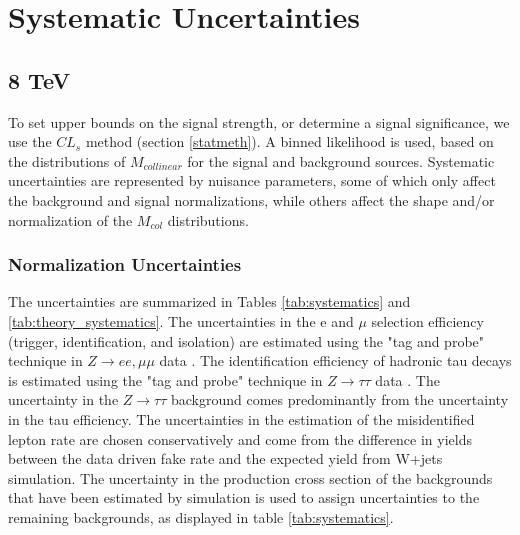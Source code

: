 \documentclass[oneside, letterpaper, oldfontcommands]{memoir}
\begin{document}
\section{Systematic Uncertainties}\label{sysuncert}
\subsection{8 TeV}

\qquad To set upper bounds on the signal strength, or determine a signal significance, we use the $CL_{s}$ method (section \ref{statmeth}).  A binned likelihood is used, based on the distributions of $M_{collinear}$ for the signal and background sources. Systematic uncertainties are represented by nuisance parameters, some of which only affect the background and signal normalizations, while others affect the shape and/or normalization of the $M_{col}$ distributions. 

\subsubsection{Normalization Uncertainties}\label{normsys}

\qquad The uncertainties are summarized in Tables \ref{tab:systematics} and \ref{tab:theory_systematics}. The uncertainties in the e and $\mu$ selection efficiency (trigger, identification, and isolation) are estimated using the "tag and probe" technique in $Z \rightarrow ee,\mu\mu$ data \cite{Chatrchyan:2014mua}. The identification efficiency of hadronic tau decays is estimated using the "tag and probe" technique in $Z \rightarrow \tau\tau$ data \cite{1748-0221-7-01-P01001}. The uncertainty in the $Z \rightarrow \tau\tau$ background comes predominantly from the uncertainty in the tau efficiency. The uncertainties in the estimation of the misidentified lepton rate are chosen conservatively and come from the difference in yields between the data driven fake rate and the expected yield from W+jets simulation. The uncertainty in the production cross section of the backgrounds that have been estimated by simulation is used to assign uncertainties to the remaining backgrounds, as displayed in table \ref{tab:systematics}.
\end{document}
